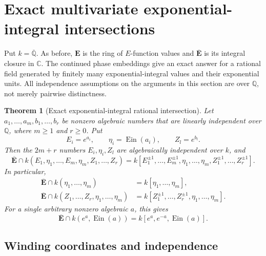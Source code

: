 \documentclass[11pt]{article}
\newtheorem{theorem}{Theorem}[section]
\theoremstyle{definition}
\theoremstyle{remark}
\newcommand{\E}{\mathbf E}
\newcommand{\Ebar}{\overline{\mathbf E}}
\newcommand{\Ein}{\operatorname{Ein}}
\begin{document}
\section{Exact multivariate exponential-integral intersections}
\label{ner:section}

Put $k=\overline{\mathbb Q}$.  As before, $\E$ is the
ring of $E$-function values and $\Ebar$ is its
integral closure in $\mathbb C$.  The continued phase embeddings
give an exact answer for a rational field generated by finitely
many exponential-integral values and their exponential units.
All independence assumptions on the arguments in this section
are over $\mathbb Q$, not merely pairwise distinctness.

\begin{theorem}[Exact exponential-integral rational intersection]
\label{ner:main}
Let $a_1,\ldots,a_m,b_1,\ldots,b_r$ be nonzero algebraic
numbers that are linearly independent over $\mathbb Q$, where
$m\ge1$ and $r\ge0$.  Put
\[
 E_i=e^{a_i},\qquad \eta_i=\Ein(a_i),
 \qquad Z_l=e^{b_l}.
\]
Then the $2m+r$ numbers $E_i,\eta_i,Z_l$ are algebraically
independent over $k$, and
\begin{equation}\label{ner:main-intersection}
 \boxed{\quad
 \Ebar\cap k(E_1,\eta_1,\ldots,E_m,\eta_m,
                                      Z_1,\ldots,Z_r)
 =k[E_1^{\pm1},\ldots,E_m^{\pm1},
                    \eta_1,\ldots,\eta_m,Z_1^{\pm1},\ldots,Z_r^{\pm1}].
 \quad}
\end{equation}
In particular,
\begin{align}
 \Ebar\cap k(\eta_1,\ldots,\eta_m)
       &=k[\eta_1,\ldots,\eta_m],\label{ner:ein-only}\\
 \Ebar\cap k(Z_1,\ldots,Z_r,\eta_1,\ldots,\eta_m)
       &=k[Z_1^{\pm1},\ldots,Z_r^{\pm1},
                                      \eta_1,\ldots,\eta_m].
                                      \label{ner:extra-units}
\end{align}
For a single arbitrary nonzero algebraic $a$, this gives
\begin{equation}\label{ner:paired-one-point}
 \Ebar\cap k(e^a,\Ein(a))
       =k[e^a,e^{-a},\Ein(a)].
\end{equation}
\end{theorem}

\subsection{Winding coordinates and independence}
\end{document}
